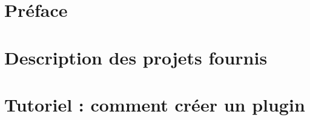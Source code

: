 \documentclass[a4paper]{report}
\begin{document}



\tableofcontents

\chapter{Préface}



\chapter{Description des projets fournis}



\chapter{Tutoriel : comment créer un plugin}

\end{document}
